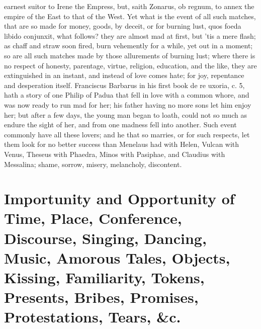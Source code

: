 {earnest suitor to Irene the Empress, but, saith Zonarus, ob
regnum, to annex the empire of the East to that of the West. Yet what
is the event of all such matches, that are so made for money, goods, by
deceit, or for burning lust, quos foeda libido conjunxit, what follows?
they are almost mad at first, but 'tis a mere flash; as chaff and straw
soon fired, burn vehemently for a while, yet out in a moment; so are
all such matches made by those allurements of burning lust; where there
is no respect of honesty, parentage, virtue, religion, education, and
the like, they are extinguished in an instant, and instead of love
comes hate; for joy, repentance and desperation itself. Franciscus
Barbarus in his first book de re uxoria, c. 5, hath a story of one
Philip of Padua that fell in love with a common whore, and was now
ready to run mad for her; his father having no more sons let him enjoy
her; but after a few days, the young man began to loath, could
not so much as endure the sight of her, and from one madness fell into
another. Such event commonly have all these lovers; and he that so
marries, or for such respects, let them look for no better success than
Menelaus had with Helen, Vulcan with Venus, Theseus with Phaedra, Minos
with Pasiphae, and Claudius with Messalina; shame, sorrow, misery,
melancholy, discontent.

\section[Importunity and Opportunity of Time, Place\ldots{}]{Importunity and Opportunity of Time, Place, Conference, Discourse, Singing, Dancing, Music, Amorous Tales, Objects, Kissing, Familiarity, Tokens, Presents, Bribes, Promises, Protestations, Tears, \&c.}

}
